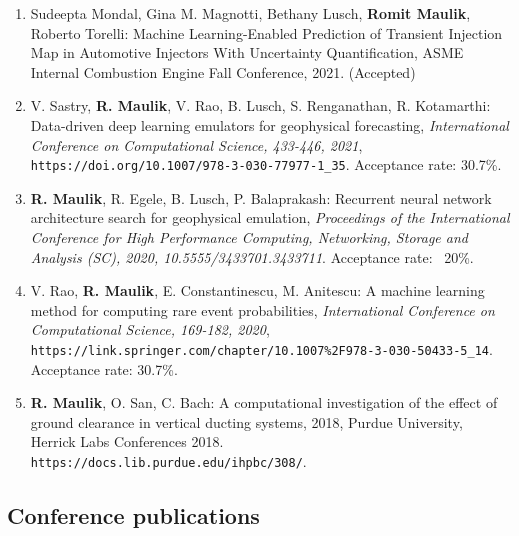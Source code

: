 \documentclass[letterpaper]{article}
\begin{document}
\begin{enumerate}

\item Sudeepta Mondal, Gina M. Magnotti, Bethany Lusch, \textbf{Romit Maulik}, Roberto Torelli: Machine Learning-Enabled Prediction of Transient Injection Map in Automotive Injectors With Uncertainty Quantification, ASME Internal Combustion Engine Fall Conference, 2021. (Accepted)

\item V. Sastry, \textbf{R. Maulik}, V. Rao, B. Lusch, S. Renganathan, R. Kotamarthi: Data-driven deep learning emulators for geophysical forecasting, {\it International Conference on Computational Science, 433-446, 2021}, \\ \texttt{https://doi.org/10.1007/978-3-030-77977-1\_35}. Acceptance rate: 30.7\%.

\item \textbf{R. Maulik}, R. Egele, B. Lusch,  P. Balaprakash: Recurrent neural network architecture search for geophysical emulation, {\it Proceedings of the International Conference for High Performance Computing, Networking, Storage and Analysis (SC), 2020, 10.5555/3433701.3433711}. Acceptance rate: ~20\%.

\item V. Rao, \textbf{R. Maulik}, E. Constantinescu, M. Anitescu: A machine learning method for computing rare event probabilities, {\it International Conference on Computational Science, 169-182, 2020}, \\ \texttt{https://link.springer.com/chapter/10.1007\%2F978-3-030-50433-5\_14}. Acceptance rate: 30.7\%.

\item \textbf{R. Maulik}, O. San, C. Bach: A computational investigation of the effect of ground clearance in vertical ducting systems, 2018, Purdue University, Herrick Labs Conferences 2018. \\ \texttt{https://docs.lib.purdue.edu/ihpbc/308/}.

\end{enumerate}

\subsection*{Conference publications}
\end{document}

